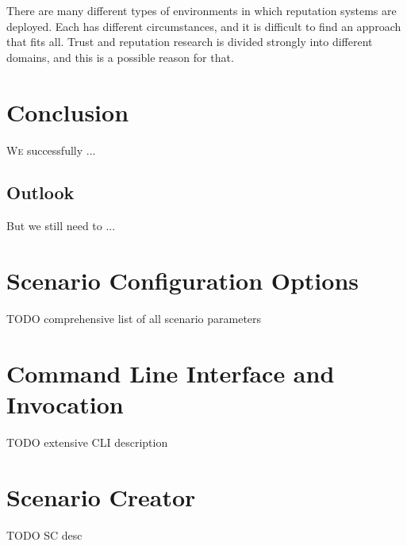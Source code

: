 \documentclass[%
    ]{\PathToTumTemplate/thesis/tum_thesis}
\begin{document}
There are many different types of environments in which reputation systems are deployed.
Each has different circumstances, and it is difficult to find an approach that fits all.
Trust and reputation research is divided strongly into different domains, and this is a possible reason for that.


\chapter{Conclusion} \label{chap:conclusion}
 
\lettrine{W}{e} successfully ...




\section{Outlook}\label{sec:outlook}

But we still need to ...






\begin{appendix}
\chapter{Scenario Configuration Options}\label{appendix:scenarios}
TODO comprehensive list of all scenario parameters

\chapter{Command Line Interface and Invocation}\label{appendix:cli_invocation}
TODO extensive CLI description

\chapter{Scenario Creator}\label{appendix:sc}
TODO SC desc

\end{appendix}
\end{document}
